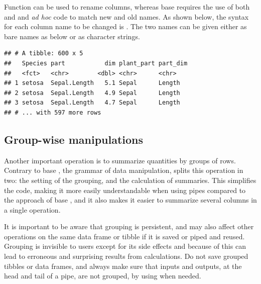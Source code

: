 \documentclass[krantz2]{krantz}\usepackage{knitr}
\begin{document}
Function  can be used to rename columns, whereas base \Rlang requires the use of both  and  and \emph{ad hoc} code to match new and old names. As shown below, the syntax for each column name to be changed is . The two names can be given either as bare names as below or as character strings.

\begin{knitrout}\footnotesize
{}\color{fgcolor}\begin{kframe}
\begin{alltt}
  
\end{alltt}
\begin{verbatim}
## # A tibble: 600 x 5
##   Species part           dim plant_part part_dim
##   <fct>   <chr>        <dbl> <chr>      <chr>
## 1 setosa  Sepal.Length   5.1 Sepal      Length
## 2 setosa  Sepal.Length   4.9 Sepal      Length
## 3 setosa  Sepal.Length   4.7 Sepal      Length
## # ... with 597 more rows
\end{verbatim}
\end{kframe}
\end{knitrout}

\subsection{Group-wise manipulations}

Another important operation is to summarize quantities by groups of rows. Contrary to base \Rlang, the grammar of data manipulation, splits this operation in two: the setting of the grouping, and the calculation of summaries. This simplifies the code, making it more easily understandable when using pipes compared to the approach of base \Rlang {}, and it also makes it easier to summarize several columns in a single operation.

\begin{warningbox}
It is important to be aware that grouping is persistent, and may also affect other operations on the same data frame or tibble if it is saved or piped and reused. Grouping is invisible to users except for its side effects and because of this can lead to erroneous and surprising results from calculations. Do not save grouped tibbles or data frames, and always make sure that inputs and outputs, at the head and tail of a pipe, are not grouped, by using  when needed.
\end{warningbox}
\end{document}

